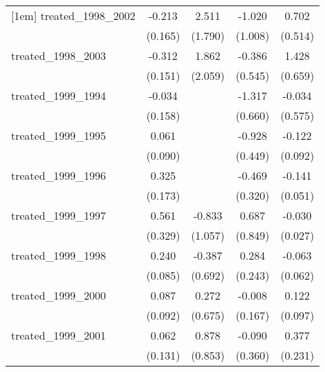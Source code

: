 {\begin{tabular}{l*{4}{c}}
[1em]
treated\_1998\_2002&      -0.213         &       2.511         &      -1.020         &       0.702         \\
            &     (0.165)         &     (1.790)         &     (1.008)         &     (0.514)         \\
[1em]
treated\_1998\_2003&      -0.312\sym{*}  &       1.862         &      -0.386         &       1.428\sym{*}  \\
            &     (0.151)         &     (2.059)         &     (0.545)         &     (0.659)         \\
[1em]
treated\_1999\_1994&      -0.034         &                     &      -1.317\sym{*}  &      -0.034         \\
            &     (0.158)         &                     &     (0.660)         &     (0.575)         \\
[1em]
treated\_1999\_1995&       0.061         &                     &      -0.928\sym{*}  &      -0.122         \\
            &     (0.090)         &                     &     (0.449)         &     (0.092)         \\
[1em]
treated\_1999\_1996&       0.325         &                     &      -0.469         &      -0.141\sym{**} \\
            &     (0.173)         &                     &     (0.320)         &     (0.051)         \\
[1em]
treated\_1999\_1997&       0.561         &      -0.833         &       0.687         &      -0.030         \\
            &     (0.329)         &     (1.057)         &     (0.849)         &     (0.027)         \\
[1em]
treated\_1999\_1998&       0.240\sym{**} &      -0.387         &       0.284         &      -0.063         \\
            &     (0.085)         &     (0.692)         &     (0.243)         &     (0.062)         \\
[1em]
treated\_1999\_2000&       0.087         &       0.272         &      -0.008         &       0.122         \\
            &     (0.092)         &     (0.675)         &     (0.167)         &     (0.097)         \\
[1em]
treated\_1999\_2001&       0.062         &       0.878         &      -0.090         &       0.377         \\
            &     (0.131)         &     (0.853)         &     (0.360)         &     (0.231)         \\

\end{tabular}}
